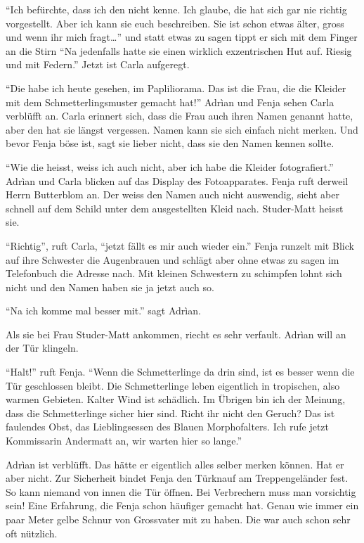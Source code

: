 \enquote{Ich befürchte, dass ich den nicht kenne. Ich glaube, die hat sich gar nie richtig vorgestellt. Aber ich kann sie euch beschreiben. Sie ist schon etwas älter, gross und wenn ihr mich fragt\dots} und statt etwas zu sagen tippt er sich mit dem Finger an die Stirn \enquote{Na jedenfalls hatte sie einen wirklich exzentrischen Hut auf. Riesig und mit Federn.} Jetzt ist Carla aufgeregt. 

\enquote{Die habe ich heute gesehen, im Papliliorama. Das ist die Frau, die die Kleider mit dem Schmetterlingsmuster gemacht hat!} Adrìan und Fenja sehen Carla verblüfft an. Carla erinnert sich, dass die Frau auch ihren Namen genannt hatte, aber den hat sie längst vergessen. Namen kann sie sich einfach nicht merken. Und bevor Fenja böse ist, sagt sie lieber nicht, dass sie den Namen kennen sollte.

\enquote{Wie die heisst, weiss ich auch nicht, aber ich habe die Kleider fotografiert.} Adrìan und Carla blicken auf das Display des Fotoapparates. Fenja ruft derweil Herrn Butterblom an. Der weiss den Namen auch nicht auswendig, sieht aber schnell auf dem Schild unter dem ausgestellten Kleid nach. Studer-Matt heisst sie.

\enquote{Richtig}, ruft Carla, \enquote{jetzt fällt es mir auch wieder ein.} Fenja runzelt mit Blick auf ihre Schwester die Augenbrauen und schlägt aber ohne etwas zu sagen im Telefonbuch die Adresse nach. Mit kleinen Schwestern zu schimpfen lohnt sich nicht und den Namen haben sie ja jetzt auch so.

\enquote{Na ich komme mal besser mit.} sagt Adrìan.

Als sie bei Frau Studer-Matt ankommen, riecht es sehr verfault. Adrìan will an der Tür klingeln.

\enquote{Halt!} ruft Fenja. \enquote{Wenn die Schmetterlinge da drin sind, ist es besser wenn die Tür geschlossen bleibt. Die Schmetterlinge leben eigentlich in tropischen, also warmen Gebieten. Kalter Wind ist schädlich. Im Übrigen bin ich der Meinung, dass die Schmetterlinge sicher hier sind. Richt ihr nicht den Geruch? Das ist faulendes Obst, das Lieblingsessen des Blauen Morphofalters. Ich rufe jetzt Kommissarin Andermatt an, wir warten hier so lange.}

Adrìan ist verblüfft. Das hätte er eigentlich alles selber merken können. Hat er aber nicht. Zur Sicherheit bindet Fenja den Türknauf am Treppengeländer fest. So kann niemand von innen die Tür öffnen. Bei Verbrechern muss man vorsichtig sein! Eine Erfahrung, die Fenja schon häufiger gemacht hat. Genau wie immer ein paar Meter gelbe Schnur von Grossvater mit zu haben. Die war auch schon sehr oft nützlich. 

